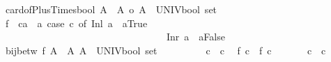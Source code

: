 \begin{isabellebody}
\endisatagproof
{\isafoldproof}%
%
\isadelimproof
\isanewline
%
\endisadelimproof
\isanewline
{}\isamarkupfalse%
\ card{\isacharunderscore}{\kern0pt}of{\isacharunderscore}{\kern0pt}Plus{\isacharunderscore}{\kern0pt}Times{\isacharunderscore}{\kern0pt}bool{\isacharcolon}{\kern0pt}\ {\isachardoublequoteopen}{\isacharbar}{\kern0pt}A\ {\isacharless}{\kern0pt}{\isacharplus}{\kern0pt}{\isachargreater}{\kern0pt}\ A{\isacharbar}{\kern0pt}\ {\isacharequal}{\kern0pt}o\ {\isacharbar}{\kern0pt}A\ {\isasymtimes}\ {\isacharparenleft}{\kern0pt}UNIV{\isacharcolon}{\kern0pt}{\isacharcolon}{\kern0pt}bool\ set{\isacharparenright}{\kern0pt}{\isacharbar}{\kern0pt}{\isachardoublequoteclose}\isanewline
%
\isadelimproof
%
\endisadelimproof
%
\isatagproof
{}\isamarkupfalse%
{\isacharminus}{\kern0pt}\isanewline
\ \ \isamarkupfalse%
\ {\isacharquery}{\kern0pt}f\ {\isacharequal}{\kern0pt}\ {\isachardoublequoteopen}{\isasymlambda}c{\isacharcolon}{\kern0pt}{\isacharcolon}{\kern0pt}{\isacharprime}{\kern0pt}a\ {\isacharplus}{\kern0pt}\ {\isacharprime}{\kern0pt}a{\isachardot}{\kern0pt}\ case\ c\ of\ Inl\ a\ {\isasymRightarrow}\ {\isacharparenleft}{\kern0pt}a{\isacharcomma}{\kern0pt}True{\isacharparenright}{\kern0pt}\isanewline
\ \ \ \ \ \ \ \ \ \ \ \ \ \ \ \ \ \ \ \ \ \ \ \ \ \ \ \ \ \ \ \ \ \ {\isacharbar}{\kern0pt}Inr\ a\ {\isasymRightarrow}\ {\isacharparenleft}{\kern0pt}a{\isacharcomma}{\kern0pt}False{\isacharparenright}{\kern0pt}{\isachardoublequoteclose}\isanewline
\ \ \isamarkupfalse%
\ {\isachardoublequoteopen}bij{\isacharunderscore}{\kern0pt}betw\ {\isacharquery}{\kern0pt}f\ {\isacharparenleft}{\kern0pt}A\ {\isacharless}{\kern0pt}{\isacharplus}{\kern0pt}{\isachargreater}{\kern0pt}\ A{\isacharparenright}{\kern0pt}\ {\isacharparenleft}{\kern0pt}A\ {\isasymtimes}\ {\isacharparenleft}{\kern0pt}UNIV{\isacharcolon}{\kern0pt}{\isacharcolon}{\kern0pt}bool\ set{\isacharparenright}{\kern0pt}{\isacharparenright}{\kern0pt}{\isachardoublequoteclose}\isanewline
\ \ \isamarkupfalse%
{\isacharminus}{\kern0pt}\isanewline
\ \ \ \ \isacommand{{\isacharbraceleft}{\kern0pt}}\isamarkupfalse%
\isamarkupfalse%
\ \ c{}\ \ c{}\ \isamarkupfalse%
\ {\isachardoublequoteopen}{\isacharquery}{\kern0pt}f\ c{}\ {\isacharequal}{\kern0pt}\ {\isacharquery}{\kern0pt}f\ c{}{\isachardoublequoteclose}\isanewline
\ \ \ \ \ \isamarkupfalse%
\ {\isachardoublequoteopen}c{}\ {\isacharequal}{\kern0pt}\ c{}{\isachardoublequoteclose}\isanewline

\end{isabellebody}
